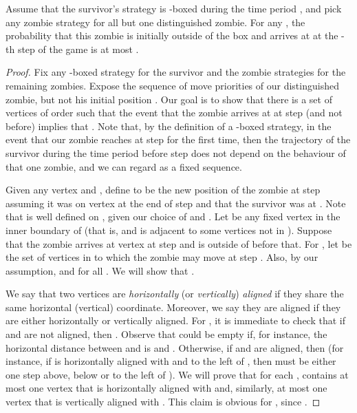 \documentclass[12pt]{amsart}
\begin{document}
\begin{lemma}\label{lem:arrivalB}
Assume that the survivor's strategy is -boxed during the time period , and pick any zombie strategy for all but one distinguished zombie. For any , the probability that this
zombie is initially outside of the box  and arrives at  at the -th step of the game is at most .
\end{lemma}
\begin{proof}
Fix any -boxed strategy for the survivor and the zombie strategies for the remaining zombies. Expose the sequence  of move priorities of our distinguished zombie, but not his initial
position . Our goal is to show that there is a set of vertices  of order  such that the event that the zombie arrives at  at step  (and not before) implies that
. Note that, by the definition of a -boxed strategy, in the event that our zombie reaches  at step  for the first time, then the trajectory  of the
survivor during the time period before step  does not depend on the behaviour of that one zombie, and we can regard  as a fixed sequence.

Given any vertex  and , define  to be the new position of the zombie at step  assuming it was on vertex  at the end of step
 and that the survivor was at . Note that  is well defined on , given our choice of  and . Let  be any fixed vertex in the inner
boundary of  (that is,  and  is adjacent to some vertices not in ). Suppose that the zombie arrives at vertex  at step  and is outside of  before that. For
,  let  be the set of vertices in  to which the zombie may move at step . Also,  by our assumption, and
 for all . We will show that .

We say that two vertices are \emph{horizontally} (or \emph{vertically}) \emph{aligned} if they share the same  horizontal (vertical) coordinate. Moreover, we say they are aligned if they are either
horizontally or vertically aligned. For , it is immediate to check that if  and  are not aligned, then . Observe that  could be empty
if, for instance, the horizontal distance between  and  is  and . Otherwise, if  and  are aligned, then  (for instance, if  is horizontally aligned with  and to the left of , then  must be either one step above, below or to the left of ). We will prove that for
each ,  contains at most one vertex that is horizontally aligned with  and, similarly, at most one vertex that is vertically aligned with . This claim is
obvious for , since . 


\end{proof}
\end{document}
